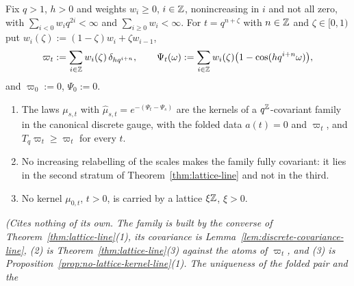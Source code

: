 \begin{proposition}
\label{prop:discrete-gaussian-pyramid}
\leanok
Fix $q > 1$, $h > 0$ and weights $w_i \ge 0$, $i \in \mathbb{Z}$, nonincreasing in $i$ and not all zero,
with $\sum_{i < 0}w_iq^{2i} < \infty$ and $\sum_{i \ge 0}w_i < \infty$. For $t = q^{n+\zeta}$
with $n \in \mathbb{Z}$ and $\zeta \in [0,1)$ put $w_i(\zeta) := (1-\zeta)w_i + \zeta w_{i-1}$,
\[
  \varpi_t := \sum_{i \in \mathbb{Z}}w_i(\zeta)\,\delta_{hq^{i+n}}, \qquad
  \Psi_t(\omega) := \sum_{i \in \mathbb{Z}}w_i(\zeta)\bigl(1 - \cos(hq^{i+n}\omega)\bigr),
\]
and $\varpi_0 := 0$, $\Psi_0 := 0$.
\begin{enumerate}
\item The laws $\mu_{s,t}$ with $\widehat\mu_{s,t} = e^{-(\Psi_t - \Psi_s)}$ are the kernels of a
$q^{\mathbb{Z}}$-covariant family in the canonical discrete gauge, with the folded data $a(t) = 0$ and
$\varpi_t$, and $T_q\varpi_t \ge \varpi_t$ for every $t$.
\item No increasing relabelling of the scales makes the family fully covariant: it lies in the
second stratum of Theorem~\ref{thm:lattice-line} and not in the third.
\item No kernel $\mu_{0,t}$, $t > 0$, is carried by a lattice $\xi\mathbb{Z}$, $\xi > 0$.
\end{enumerate}
\statusT\quad\emph{(Cites nothing of its own. The family is built by the converse of
Theorem~\ref{thm:lattice-line}(1), its covariance is Lemma~\ref{lem:discrete-covariance-line},
(2) is Theorem~\ref{thm:lattice-line}(3) against the atoms of $\varpi_t$, and (3) is
Proposition~\ref{prop:no-lattice-kernel-line}(1). The uniqueness of the folded pair and the
}
\end{proposition}
